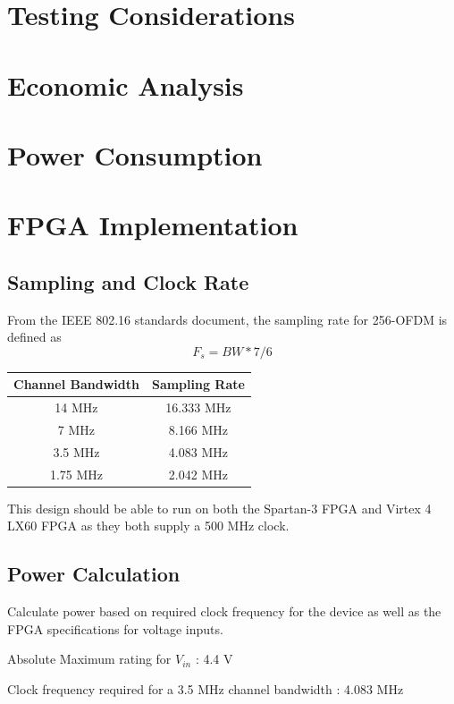 \documentclass[dvips,10pt,twocolumn]{article}
\begin{document}

\section{Testing Considerations}
\section{Economic Analysis}
\section{Power Consumption}
\section{FPGA Implementation}
  \subsection{Sampling and Clock Rate}
    From the IEEE 802.16 standards document, the sampling rate for
    256-OFDM is defined as
    \begin{equation}
    F_s = BW * 7/6
    \end{equation}
  
  \begin{center}
  \begin{tabular}{c|c}
  Channel Bandwidth & Sampling Rate \\ \hline
  14 MHz & 16.333 MHz \\
  7 MHz & 8.166 MHz \\
  3.5 MHz & 4.083 MHz \\
  1.75 MHz & 2.042 MHz
  \end{tabular}
  \end{center}
  
  This design should be able to run on both the Spartan-3 FPGA and Virtex 4 LX60
  FPGA as they both supply a 500 MHz clock.
  
  \subsection{Power Calculation}
  
  Calculate power based on required clock frequency for the device as well as the
  FPGA specifications for voltage inputs.
  
  Absolute Maximum rating for $V_{in}$ : 4.4 V
  
  Clock frequency required for a 3.5 MHz channel bandwidth : 4.083 MHz
  
\end{document}
